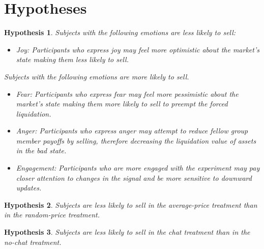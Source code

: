 \documentclass[11pt]{article}
\newtheorem{hypothesis}{Hypothesis}
\begin{document}
\section{Hypotheses}

\begin{hypothesis}\label{chat_treatment}
    Subjects with the following emotions are less likely to sell:
    \begin{itemize}
        \item Joy: Participants who express joy may feel more optimistic about the market's state making them less likely to sell.
    \end{itemize}
    Subjects with the following emotions are more likely to sell.
    \begin{itemize}
        \item Fear: Participants who express fear may feel more pessimistic about the market's state making them more likely to sell to preempt the forced liquidation.
        \item Anger: Participants who express anger may attempt to reduce fellow group member payoffs by selling, therefore decreasing the liquidation value of assets in the bad state.
        \item Engagement: Participants who are more engaged with the experiment may pay closer attention to changes in the signal and be more sensitive to downward updates.
    \end{itemize}
\end{hypothesis}

\begin{hypothesis}\label{price_treatment}
    Subjects are less likely to sell in the average-price treatment than in the random-price treatment.   
\end{hypothesis}

\begin{hypothesis}\label{chat_treatment}
    Subjects are less likely to sell in the chat treatment than in the no-chat treatment.  
\end{hypothesis}
\end{document}
